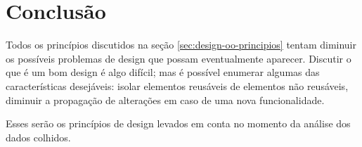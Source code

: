\section{Conclusão}

Todos os princípios discutidos na seção \ref{sec:design-oo-principios} tentam
diminuir os possíveis problemas de design que possam eventualmente aparecer.
Discutir o que é um bom design é algo difícil; mas é possível enumerar algumas
das características desejáveis: isolar elementos reusáveis de elementos não
reusáveis, diminuir a propagação de alterações em caso de uma nova
funcionalidade.

Esses serão os princípios de design levados em conta no momento da análise
dos dados colhidos.